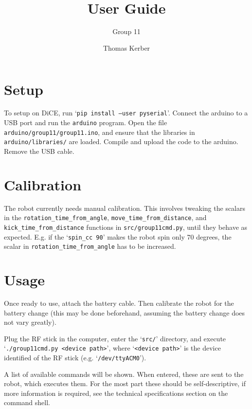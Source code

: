 \documentclass[a4paper]{scrartcl}
\author{Thomas Kerber}
\title{User Guide}
\subtitle{Group 11}
\begin{document}
\maketitle
\section{Setup}

To setup on DiCE, run `\texttt{pip install --user pyserial}'. Connect the
arduino to a USB port and run the \texttt{arduino} program. Open the file
\verb$arduino/group11/group11.ino$, and ensure that the libraries in
\verb$arduino/libraries/$ are loaded. Compile and upload the code to the
arduino. Remove the USB cable.

\section{Calibration}

The robot currently needs manual calibration. This involves tweaking the
scalars in the \texttt{rotation\_time\_from\_angle},
\texttt{move\_time\_from\_distance}, and \texttt{kick\_time\_from\_distance}
functions in \verb$src/group11cmd.py$, until they behave as expected. E.g. if
the `\texttt{spin\_cc 90}' makes the robot spin only 70 degrees, the scalar in
\texttt{rotation\_time\_from\_angle} has to be increased.

\section{Usage}

Once ready to use, attach the battery cable. Then calibrate the robot for the
battery change (this may be done beforehand, assuming the battery change does
not vary greatly).

Plug the RF stick in the computer, enter the `\verb$src/$' directory, and
execute `\texttt{./group11cmd.py <device path>}', where `\texttt{<device
path>}' is the device identified of the RF stick (e.g. `\verb$/dev/ttyACM0$').

A list of available commands will be shown. When entered, these are sent to the
robot, which executes them. For the most part these should be self-descriptive,
if more information is required, see the technical specifications section on
the command shell.
\end{document}
